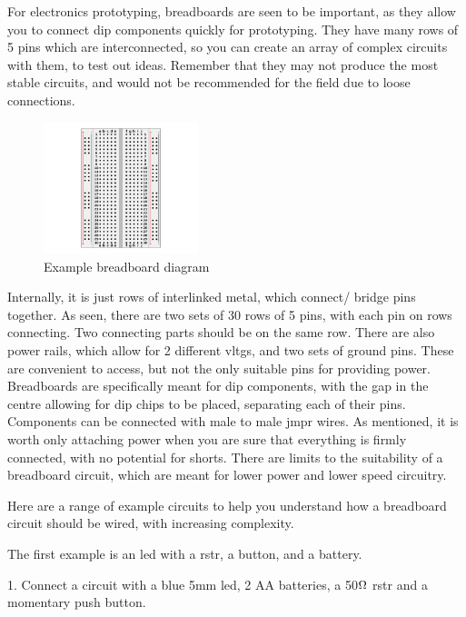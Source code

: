 \documentclass[a4paper,11pt]{report}
\newcommand{\Examples}[1] %
{
\par\noindent %
\phantomsection %
\todo[inline, color=red!30]{\textbf{#1}} %
\vspace{1em} %
}
\newcommand{\Quiz}[1] %
{
\par\noindent %
\phantomsection %
\todo[inline, color=blue!30]{\textbf{#1}} %
\vspace{1em} %
}
\begin{document}
For electronics prototyping, breadboards are seen to be important, as they allow you to connect \gls{dip} components quickly for prototyping. They have many rows of 5 pins which are interconnected, so you can create an array of complex circuits with them, to test out ideas. Remember that they may not produce the most stable circuits, and would not be recommended for the field due to loose connections.

\begin{figure}[H]
\centering
\includegraphics[width=0.4\textwidth]{breadboard}
\caption{Example breadboard diagram}
\end{figure}

Internally, it is just rows of interlinked metal, which connect/ bridge pins together. As seen, there are two sets of 30 rows of 5 pins, with each pin on rows connecting. Two connecting parts should be on the same row. There are also power rails, which allow for 2 different \gls{vltg}s, and two sets of ground pins. These are convenient to access, but not the only suitable pins for providing power. Breadboards are specifically meant for \gls{dip} components, with the gap in the centre allowing for \gls{dip} chips to be placed, separating each of their pins. Components can be connected with male to male \gls{jmpr} wires. As mentioned, it is worth only attaching power when you are sure that everything is firmly connected, with no potential for shorts. There are limits to the suitability of a breadboard circuit, which are meant for lower power and lower speed circuitry.

\Examples{Examples}

Here are a range of example circuits to help you understand how a breadboard circuit should be wired, with increasing complexity.

The first example is an \gls{led} with a \gls{rstr}, a button, and a battery.

\Quiz{Challenges}

1. Connect a circuit with a blue 5mm led, 2 AA batteries, a 50$\ohm$ \gls{rstr} and a momentary push button.
\end{document}
